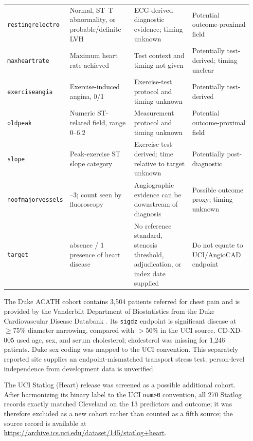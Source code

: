 \documentclass[12pt]{article}
\begin{document}
\begin{table}[t]
\begin{tabular}{@{}>{\raggedright\arraybackslash}p{2.0cm}>{\raggedright\arraybackslash}p{4.8cm}>{\raggedright\arraybackslash}p{6.1cm}>{\raggedright\arraybackslash}p{2.9cm}@{}}
\texttt{resting\allowbreak relectro} & Normal, ST--T abnormality, or probable/definite LVH & ECG-derived diagnostic evidence; timing unknown & Potential outcome-proximal field \\
\texttt{max\allowbreak heartrate} & Maximum heart rate achieved & Test context and timing not given & Potentially test-derived; timing unclear \\
\texttt{exercise\allowbreak angia} & Exercise-induced angina, 0/1 & Exercise-test protocol and timing unknown & Potentially test-derived \\
\texttt{oldpeak} & Numeric ST-related field, range 0--6.2 & Measurement protocol and timing unknown & Potential outcome-proximal field \\
\texttt{slope} & Peak-exercise ST slope category & Exercise-test-derived; time relative to target unknown & Potentially post-diagnostic \\
\texttt{noof\allowbreak major\allowbreak vessels} & 0--3; count seen by fluoroscopy & Angiographic evidence can be downstream of diagnosis & Possible outcome proxy; timing unknown \\
\texttt{target} & 0 absence / 1 presence of heart disease & No reference standard, stenosis threshold, adjudication, or index date supplied & Do not equate to UCI/AngioCAD endpoint \\
\bottomrule
\end{tabular}
\end{table}

The Duke ACATH cohort contains 3,504 patients referred for chest pain and is
provided by the Vanderbilt Department of Biostatistics from the Duke
Cardiovascular Disease Databank \cite{dukeacath2026}. Its \texttt{sigdz}
endpoint is significant disease at \(\geq 75\%\) diameter narrowing, compared
with \(>50\%\) in the UCI source. CD-XD-005 used age, sex, and serum
cholesterol; cholesterol was missing for 1,246 patients. Duke sex coding was
mapped to the UCI convention. This separately reported site supplies an
endpoint-mismatched transport stress test; person-level independence from
development data is unverified.

The UCI Statlog (Heart) release was screened as a possible additional cohort.
After harmonizing its binary label to the UCI \texttt{num>0} convention, all 270
Statlog records exactly matched Cleveland on the 13 predictors and outcome;
it was therefore excluded as a new cohort rather than counted as a fifth
source; the source record is available at
\url{https://archive.ics.uci.edu/dataset/145/statlog+heart}.
\end{document}
